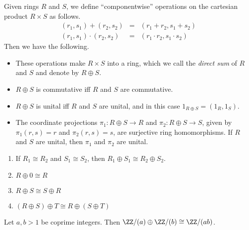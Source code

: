 \documentclass{article}
\begin{document}

\begin{thm}
Given rings $R$ and $S$, we define ``componentwise'' operations on the cartesian product $R \times S$ as follows.
\begin{eqnarray*}
(r_1, s_1) + (r_2, s_2) & = & (r_1 + r_2, s_1 + s_2) \\
(r_1, s_1) \cdot (r_2, s_2) & = & (r_1 \cdot r_2, s_1 \cdot s_2)
\end{eqnarray*}
Then we have the following.
\begin{itemize}
\item These operations make $R \times S$ into a ring, which we call the \emph{direct sum} of $R$ and $S$ and denote by $R \oplus S$.
\item $R \oplus S$ is commutative iff $R$ and $S$ are commutative.
\item $R \oplus S$ is unital iff $R$ and $S$ are unital, and in this case $1_{R \oplus S} = (1_R, 1_S)$.
\item The coordinate projections $\pi_1 : R \oplus S \rightarrow R$ and $\pi_2 : R \oplus S \rightarrow S$, given by $\pi_1(r,s) = r$ and $\pi_2(r,s) = s$, are surjective ring homomorphisms. If $R$ and $S$ are unital, then $\pi_1$ and $\pi_2$ are unital.
\end{itemize}
\end{thm}

\begin{prop} \mbox{}
\begin{enumerate}
\item If $R_1 \cong R_2$ and $S_1 \cong S_2$, then $R_1 \oplus S_1 \cong R_2 \oplus S_2$.
\item $R \oplus 0 \cong R$
\item $R \oplus S \cong S \oplus R$
\item $(R \oplus S) \oplus T \cong R \oplus (S \oplus T)$
\end{enumerate}
\end{prop}

\begin{prop}
Let $a, b > 1$ be coprime integers. Then $\ZZ/(a) \oplus \ZZ/(b) \cong \ZZ/(ab)$.
\end{prop}
\end{document}
